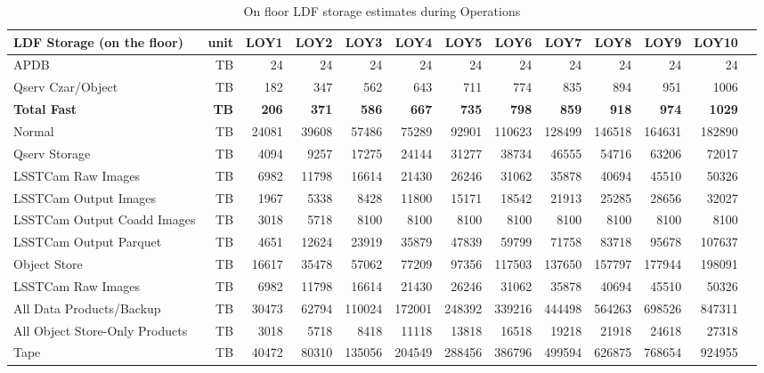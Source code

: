 \tiny \begin{longtable} { |p{}  |r  |r  |r  |r  |r  |r  |r  |r  |r  |r  |r  |r |} 
\caption{On floor LDF storage estimates during Operations
 \label{tab:storageFloorOps}}\\ 
\hline 
\textbf{LDF Storage (on the floor)}&\textbf{unit}&\textbf{LOY1}&\textbf{LOY2}&\textbf{LOY3}&\textbf{LOY4}&\textbf{LOY5}&\textbf{LOY6}&\textbf{LOY7}&\textbf{LOY8}&\textbf{LOY9}&\textbf{LOY10} \\ \hline
{APDB}&{TB}&{24}&{24}&{24}&{24}&{24}&{24}&{24}&{24}&{24}&{24} \\ \hline
{Qserv Czar/Object}&{TB}&{182}&{347}&{562}&{643}&{711}&{774}&{835}&{894}&{951}&{1006} \\ \hline
\textbf{Total Fast}&\textbf{TB}&\textbf{206}&\textbf{371}&\textbf{586}&\textbf{667}&\textbf{735}&\textbf{798}&\textbf{859}&\textbf{918}&\textbf{974}&\textbf{1029} \\ \hline
{Normal}&{TB}&{24081}&{39608}&{57486}&{75289}&{92901}&{110623}&{128499}&{146518}&{164631}&{182890} \\ \hline
{Qserv Storage}&{TB}&{4094}&{9257}&{17275}&{24144}&{31277}&{38734}&{46555}&{54716}&{63206}&{72017} \\ \hline
{LSSTCam Raw Images}&{TB}&{6982}&{11798}&{16614}&{21430}&{26246}&{31062}&{35878}&{40694}&{45510}&{50326} \\ \hline
{LSSTCam Output Images}&{TB}&{1967}&{5338}&{8428}&{11800}&{15171}&{18542}&{21913}&{25285}&{28656}&{32027} \\ \hline
{LSSTCam Output Coadd Images}&{TB}&{3018}&{5718}&{8100}&{8100}&{8100}&{8100}&{8100}&{8100}&{8100}&{8100} \\ \hline
{LSSTCam Output Parquet}&{TB}&{4651}&{12624}&{23919}&{35879}&{47839}&{59799}&{71758}&{83718}&{95678}&{107637} \\ \hline
{Object Store}&{TB}&{16617}&{35478}&{57062}&{77209}&{97356}&{117503}&{137650}&{157797}&{177944}&{198091} \\ \hline
{LSSTCam Raw Images}&{TB}&{6982}&{11798}&{16614}&{21430}&{26246}&{31062}&{35878}&{40694}&{45510}&{50326} \\ \hline
{All Data Products/Backup}&{TB}&{30473}&{62794}&{110024}&{172001}&{248392}&{339216}&{444498}&{564263}&{698526}&{847311} \\ \hline
{All Object Store-Only Products}&{TB}&{3018}&{5718}&{8418}&{11118}&{13818}&{16518}&{19218}&{21918}&{24618}&{27318} \\ \hline
{Tape}&{TB}&{40472}&{80310}&{135056}&{204549}&{288456}&{386796}&{499594}&{626875}&{768654}&{924955} \\ \hline
\end{longtable} \normalsize
